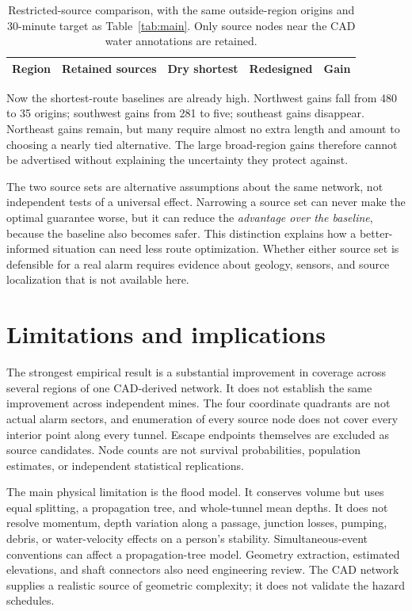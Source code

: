 \documentclass[11pt,a4paper]{article}
\begin{document}
\begin{table}[htbp]
\centering\small
\caption{Restricted-source comparison, with the same outside-region origins and 30-minute target as Table~\ref{tab:main}. Only source nodes near the CAD water annotations are retained.}\label{tab:near}
\begin{tabular}{@{}lrrrr@{}}\toprule
Region & Retained sources & Dry shortest & Redesigned & Gain\\\midrule

\end{tabular}
\end{table}

Now the shortest-route baselines are already high. Northwest gains fall from 480 to 35 origins; southwest gains from 281 to five; southeast gains disappear. Northeast gains remain, but many require almost no extra length and amount to choosing a nearly tied alternative. The large broad-region gains therefore cannot be advertised without explaining the uncertainty they protect against.

The two source sets are alternative assumptions about the same network, not independent tests of a universal effect. Narrowing a source set can never make the optimal guarantee worse, but it can reduce the \emph{advantage over the baseline}, because the baseline also becomes safer. This distinction explains how a better-informed situation can need less route optimization. Whether either source set is defensible for a real alarm requires evidence about geology, sensors, and source localization that is not available here.

\section{Limitations and implications}\label{sec:limits}
The strongest empirical result is a substantial improvement in coverage across several regions of one CAD-derived network. It does not establish the same improvement across independent mines. The four coordinate quadrants are not actual alarm sectors, and enumeration of every source node does not cover every interior point along every tunnel. Escape endpoints themselves are excluded as source candidates. Node counts are not survival probabilities, population estimates, or independent statistical replications.

The main physical limitation is the flood model. It conserves volume but uses equal splitting, a propagation tree, and whole-tunnel mean depths. It does not resolve momentum, depth variation along a passage, junction losses, pumping, debris, or water-velocity effects on a person's stability. Simultaneous-event conventions can affect a propagation-tree model. Geometry extraction, estimated elevations, and shaft connectors also need engineering review. The CAD network supplies a realistic source of geometric complexity; it does not validate the hazard schedules.
\end{document}
